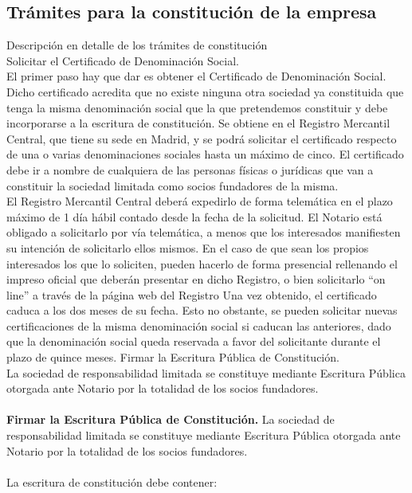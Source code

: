 \subsection{Trámites para la constitución de la empresa}
Descripción en detalle de los trámites de constitución\\
Solicitar el Certificado de Denominación Social.\\
El primer paso hay que dar es obtener el Certificado de Denominación Social. Dicho certificado acredita que no existe ninguna otra sociedad ya constituida que tenga la misma denominación social que la que pretendemos constituir y debe incorporarse a la escritura de constitución.
Se obtiene en el Registro Mercantil Central, que tiene su sede en Madrid, y se podrá solicitar el certificado respecto de una o varias denominaciones sociales hasta un máximo de cinco. El certificado debe ir a nombre de cualquiera de las personas físicas o jurídicas que van a constituir la sociedad limitada como socios fundadores de la misma.\\
El Registro Mercantil Central deberá expedirlo de forma telemática en el plazo máximo de 1 día hábil contado desde la fecha de la solicitud.
El Notario está obligado a solicitarlo por vía telemática, a menos que los interesados manifiesten su intención de solicitarlo ellos mismos.
En el caso de que sean los propios interesados los que lo soliciten, pueden hacerlo de forma presencial rellenando el impreso oficial que deberán presentar en dicho Registro, o bien solicitarlo “on line” a través de la página web del Registro 
Una vez obtenido, el certificado caduca a los dos meses de su fecha. Esto no obstante, se pueden solicitar nuevas certificaciones de la misma denominación social si caducan las anteriores, dado que la denominación social queda reservada a favor del solicitante durante el plazo de quince meses.
Firmar la Escritura Pública de Constitución.\\
La sociedad de responsabilidad limitada se constituye mediante Escritura Pública otorgada ante Notario por la totalidad de los socios fundadores.\\
\\
\textbf{Firmar la Escritura Pública de Constitución.}
La sociedad de responsabilidad limitada se constituye mediante Escritura Pública otorgada ante Notario por la totalidad de los socios fundadores.
\\
\\
La escritura de constitución debe contener:
